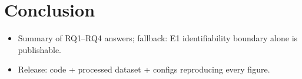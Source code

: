 \section{Conclusion}
\begin{itemize}
  \item Summary of RQ1–RQ4 answers; fallback: E1 identifiability boundary alone is publishable.
  \item Release: code + processed dataset + configs reproducing every figure.
\end{itemize}
